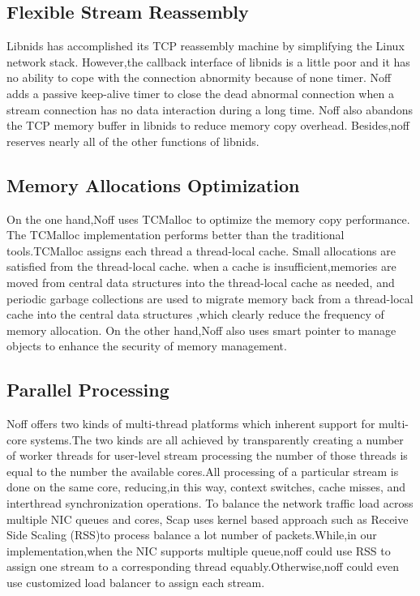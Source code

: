 \documentclass[conference]{IEEEtran}
\begin{document}
\subsection{Flexible Stream Reassembly}
Libnids\cite{Libnids} has accomplished its TCP reassembly machine by simplifying the Linux network stack. However,the callback interface of libnids is a little poor and
it has no ability to cope with the connection abnormity because of none timer. Noff adds a passive keep-alive timer to close the dead abnormal connection when
a stream connection has no data interaction during a long time. Noff also abandons the TCP memory buffer in libnids to reduce memory copy overhead. Besides,noff reserves nearly all of the other functions of libnids.

\subsection{Memory Allocations Optimization}
On the one hand,Noff uses TCMalloc\cite{Threading}\cite{Sangho} to optimize the memory copy performance. The TCMalloc implementation performs better than the traditional tools.TCMalloc assigns each thread a thread-local cache. Small allocations are satisfied from the thread-local cache. when a cache is insufficient,memories are moved from central data structures into the thread-local cache as needed, and periodic garbage collections are used to migrate memory back from a thread-local cache into the central data structures ,which clearly reduce the frequency of memory allocation.
\newline\indent On the other hand,Noff also uses smart pointer to manage objects to enhance the security of memory management.

\subsection{Parallel Processing}
Noff offers two kinds of multi-thread platforms which inherent support for multi-core systems.The two kinds are all achieved by transparently creating a number of worker threads for user-level stream processing the number of those threads is equal to the number the available cores.All processing of a particular stream is done on the same core, reducing,in this way, context switches, cache misses, and interthread synchronization operations.
\newline\indent To balance the network traffic load across multiple NIC queues and cores, Scap\cite{Papadogiannakis} uses kernel based approach such as Receive Side Scaling (RSS)\cite{Server}to process balance a lot number of packets.While,in our implementation,when the NIC supports multiple queue,noff could use RSS to assign one stream to a corresponding thread equably.Otherwise,noff could even use customized load balancer to assign each stream.
\end{document}
